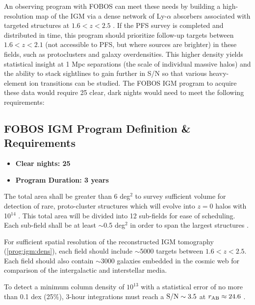 \documentclass[11pt,a4paper,twoside,onecolumn,openany,final,oldfontcommands]{memoir}
\begin{document}

An observing program with FOBOS can meet these needs by building a high-resolution map of the IGM via a dense network of Ly-$\alpha$ absorbers associated with targeted structures at $1.6 < z < 2.5$ \citep[see][]{lee16}.  If the PFS survey is completed and distributed in time, this program should prioritize follow-up targets between $1.6 < z < 2.1$ (not accessible to PFS, but where sources are brighter) in these fields, such as protoclusters and galaxy overdensities.  This higher density yields statistical insight at 1 Mpc separations (the scale of individual massive halos) and the ability to stack sightlines to gain further in S/N so that various heavy-element ion transitions can be studied.  The FOBOS IGM program to acquire these data would require 25 clear, dark nights would need to meet the following requirements:

\subsection{FOBOS IGM Program Definition \& Requirements}

\medskip
\begin{itemize}[leftmargin=0.3in, itemsep=0pt]
	\item[] \textbf{Clear nights: 25}
	\item[] \textbf{Program Duration: 3 years}
\end{itemize}


\begin{programrequirement}
\reqitem The total area shall be greater than 6 deg$^2$ to survey sufficient volume for detection of rare, proto-cluster structures which will evolve into $z=0$ halos with 10$^{14}$ \msun{}.  This total area will be divided into 12 sub-fields for ease of scheduling.  Each sub-field shall be at least $\sim$0.5 deg$^2$ in order to span the largest structures \citep[see][]{lee16}.

\reqitem For sufficient spatial resolution of the reconstructed IGM tomography (\ref{prog:igm:dens}), each field should include $\sim$5000 targets between $1.6 < z < 2.5$. 
\reqitem Each field should also contain $\sim$3000 galaxies embedded in the cosmic web for comparison of the intergalactic and interstellar media.

\reqitem To detect a minimum  column density of $10^{13}$  with a statistical error of no more than 0.1 dex (25\%), 3-hour integrations must reach a ${\rm S/N} \sim 3.5$ at $r_{\rm AB} \approx 24.6$ . 

\end{programrequirement}
\end{document}
